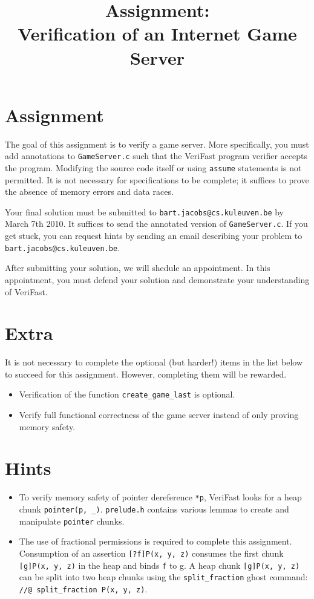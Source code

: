 \documentclass{article}
\title{Assignment:\\
Verification of an Internet Game Server}
\begin{document}
\maketitle

\section{Assignment}
The goal of this assignment is to verify a game server. More specifically, you must add annotations to \texttt{GameServer.c} such that the VeriFast program verifier accepts the program. Modifying the source code itself or using \texttt{assume} statements is not permitted. It is not necessary for specifications to be complete; it suffices to prove the absence of memory errors and data races.

Your final solution must be submitted to \texttt{bart.jacobs@cs.kuleuven.be} by March 7th 2010. It suffices to send the annotated version of \texttt{GameServer.c}. If you get stuck, you can request hints by sending an email describing your problem to \texttt{bart.jacobs@cs.kuleuven.be}.

After submitting your solution, we will shedule an appointment. In this appointment, you must defend your solution and demonstrate your understanding of VeriFast.

\section{Extra}
It is not necessary to complete the optional (but harder!) items in the list below to succeed for this assignment. However, completing them will be rewarded.

\begin{itemize}
  \item Verification of the function \texttt{create\_game\_last} is optional.
  \item Verify full functional correctness of the game server instead of only proving memory safety. 
\end{itemize}

\section{Hints}

\begin{itemize}
  \item To verify memory safety of pointer dereference \texttt{*p}, VeriFast looks for a heap chunk \texttt{pointer(p, \_)}. \texttt{prelude.h} contains various lemmas to create and manipulate \texttt{pointer} chunks.
  \item The use of fractional permissions is required to complete this assignment. Consumption of an assertion \texttt{[?f]P(x, y, z)} consumes the first chunk \texttt{[g]P(x, y, z)} in the heap and binds \texttt{f} to {g}. A heap chunk \texttt{[g]P(x, y, z)} can be split into two heap chunks using the \texttt{split\_fraction} ghost command: \texttt{//@ split\_fraction P(x, y, z)}.
\end{itemize}
\end{document}
